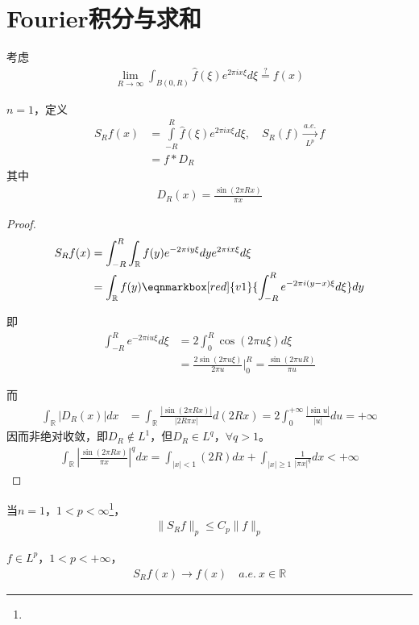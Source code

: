 \newpage
\section{Fourier积分与求和}
考虑
\begin{align*}
    \lim\limits_{R\to\infty} \int_{B(0,R)} \widehat{f}(\xi) e^{2\pi i x\xi} d\xi \overset{?}{=} f(x)
\end{align*}

\begin{definition}
    $n=1$，定义
    \begin{align*}
        S_R f(x) &= \int\limits_{-R}^R \widehat{f}(\xi) e^{2\pi i x \xi} d\xi, \quad S_R(f) \xrightarrow[L^p]{a.e.} f \\
        & = f * D_R
    \end{align*}
    其中
    \begin{align*}
        D_R(x) = \frac{\sin(2\pi R x)}{\pi x}
    \end{align*}
\end{definition}
\begin{proof}
    \begin{align*}
        S_R f(x) & = \int_{-R}^R \int_{\mathbb{R}} f(y) e^{-2\pi iy \xi} dy e^{2\pi i x \xi} d\xi \\
        & = \int_{\mathbb{R}} f(y) \eqnmarkbox[red]{v1}{\int_{-R}^R e^{-2\pi i (y-x)\xi} d\xi} dy 
 \end{align*}

 即
 \begin{align*}
     \int_{-R}^R e^{-2\pi i u \xi} d\xi &= 2\int_0^R \cos(2\pi u \xi) d\xi \\
     & = \frac{2 \sin(2\pi u \xi)}{2\pi u}\bigg|_0^R = \frac{\sin(2\pi u R)}{\pi u}
 \end{align*}

而
\begin{align*}
    \int_{\mathbb{R}} |D_R(x)| dx & = \int_{\mathbb{R}} \frac{|\sin(2\pi R x)|}{|2R\pi x|} d(2Rx) = 2\int_0^{+\infty} \frac{|\sin u|}{|u|} du = +\infty
\end{align*}
因而非绝对收敛，即$D_R\notin L^1$，但$D_R \in L^q$，$\forall q>1$。
\begin{align*}
    \int_{\mathbb{R}} \left| \frac{\sin (2\pi R x)}{\pi x}\right|^q dx = \int_{|x|<1} (2R)dx + \int_{|x|\geqslant 1} \frac{1}{|\pi x|^q}dx < + \infty
\end{align*}
\end{proof}

\begin{theorem}
    当$n=1$，$1<p<\infty$\footnote{}，
    \begin{align*}
        \|S_R f\|_p \leqslant C_p \|f\|_p 
    \end{align*}

    $f\in L^p$，$1<p<+\infty$，
\begin{align*}
    S_R f(x) \to f(x) \quad a.e.\ x\in\mathbb{R}
\end{align*}
\end{theorem}

